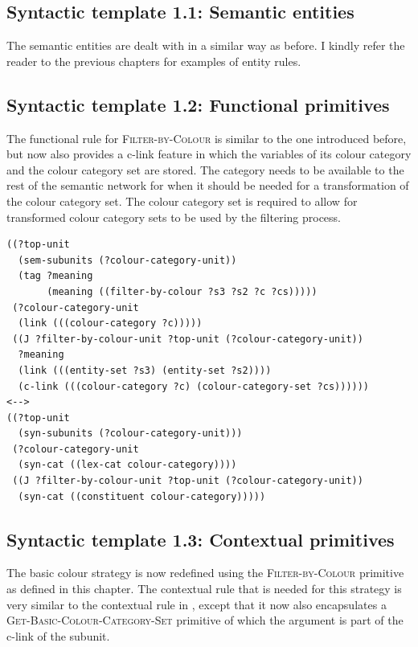 \subsection{Syntactic template 1.1: Semantic entities}

The semantic entities are dealt with in a similar way as before. I
kindly refer the reader to the previous chapters for examples of
entity rules.

\subsection{Syntactic template 1.2: Functional primitives}

The functional rule for \textsc{Filter-by-Colour} is similar to the
one introduced before, but now also provides a c-link feature
in which the variables of its colour category and the colour category
set are stored. The category needs to be available to the rest of the
semantic network for when it should be needed for a transformation of
the colour category set. The colour category set is required to allow
for transformed colour category sets to be used by the filtering
process.

\footnotesize
{}
\begin{lstlisting}
((?top-unit
  (sem-subunits (?colour-category-unit)) 
  (tag ?meaning
       (meaning ((filter-by-colour ?s3 ?s2 ?c ?cs)))))
 (?colour-category-unit 
  (link (((colour-category ?c)))))
 ((J ?filter-by-colour-unit ?top-unit (?colour-category-unit))
  ?meaning
  (link (((entity-set ?s3) (entity-set ?s2))))
  (c-link (((colour-category ?c) (colour-category-set ?cs))))))
<-->
((?top-unit 
  (syn-subunits (?colour-category-unit)))
 (?colour-category-unit 
  (syn-cat ((lex-cat colour-category))))
 ((J ?filter-by-colour-unit ?top-unit (?colour-category-unit))
  (syn-cat ((constituent colour-category)))))
\end{lstlisting}
\normalsize

\subsection{Syntactic template 1.3: Contextual primitives}

The basic colour strategy is now redefined 
using the \textsc{Filter-by-Colour} primitive as defined in this
chapter. The contextual rule that is needed for this strategy
is very similar to the contextual rule in , except that it now also encapsulates
a \textsc{Get-Basic-Colour-Category-Set} primitive of which the argument is part of
the c-link of the subunit.

